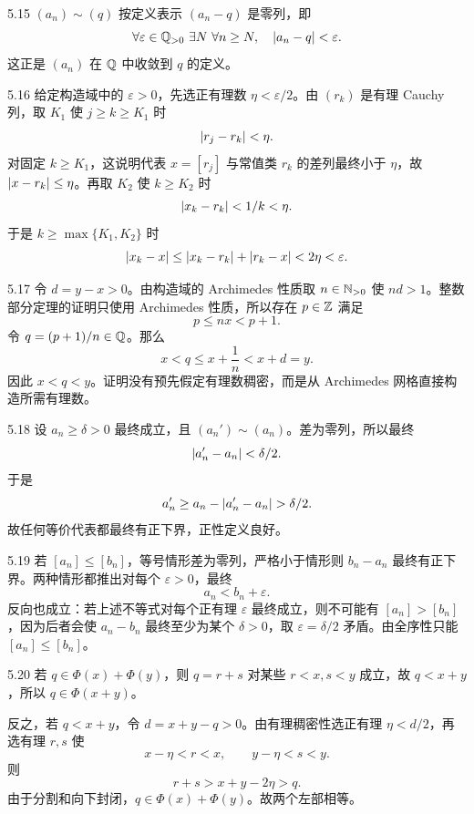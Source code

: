 \begin{solution}{5.15}
\((a_n)\sim(q)\) 按定义表示 \((a_n-q)\) 是零列，即
\[
 \forall\varepsilon\in\Q_{>0}\ \exists N\
 \forall n\ge N,\quad\abs{a_n-q}<\varepsilon.
\]
这正是 \((a_n)\) 在 \(\mathbb{Q}\) 中收敛到 \(q\) 的定义。
\end{solution}

\begin{solution}{5.16}
给定构造域中的 \(\varepsilon>0\)，先选正有理数 \(\eta<\varepsilon/2\)。由 \((r_k)\) 是有理 Cauchy 列，取 \(K_1\) 使 \(j\ge k\ge K_1\) 时
\[
 \left|r_j-r_k\right|<\eta.
\]
对固定 \(k\ge K_1\)，这说明代表 \(x=[r_j]\) 与常值类 \(r_k\) 的差列最终小于 \(\eta\)，故 \(\left|x-r_k\right|\le\eta\)。再取 \(K_2\) 使 \(k\ge K_2\) 时
\[
 \left|x_k-r_k\right|<1/k<\eta.
\]
于是 \(k\ge\max\{K_1,K_2\}\) 时
\[
 \left|x_k-x\right|\le\left|x_k-r_k\right|+\left|r_k-x\right|<2\eta<\varepsilon.
\]
\end{solution}

\begin{solution}{5.17}
令 \(d=y-x>0\)。由构造域的 Archimedes 性质取 \(n\in\mathbb{N}_{>0}\) 使 \(nd>1\)。整数部分定理的证明只使用 Archimedes 性质，所以存在 \(p\in\mathbb{Z}\) 满足
\[
 p\le nx<p+1.
\]
令 \(q=(p+1)/n\in\mathbb{Q}\)。那么
\[
 x<q\le x+\frac1n<x+d=y.
\]
因此 \(x<q<y\)。证明没有预先假定有理数稠密，而是从 Archimedes 网格直接构造所需有理数。
\end{solution}

\begin{solution}{5.18}
设 \(a_n\ge\delta>0\) 最终成立，且 \((a_n')\sim(a_n)\)。差为零列，所以最终
\[
 \left|a_n'-a_n\right|<\delta/2.
\]
于是
\[
 a_n'\ge a_n-\abs{a_n'-a_n}>\delta/2.
\]
故任何等价代表都最终有正下界，正性定义良好。
\end{solution}

\begin{solution}{5.19}
若 \([a_n]\le[b_n]\)，等号情形差为零列，严格小于情形则 \(b_n-a_n\) 最终有正下界。两种情形都推出对每个 \(\varepsilon>0\)，最终
\[
 a_n<b_n+\varepsilon.
\]
反向也成立：若上述不等式对每个正有理 \(\varepsilon\) 最终成立，则不可能有 \([a_n]>[b_n]\)，因为后者会使 \(a_n-b_n\) 最终至少为某个 \(\delta>0\)，取 \(\varepsilon=\delta/2\) 矛盾。由全序性只能 \([a_n]\le[b_n]\)。
\end{solution}

\begin{solution}{5.20}
若 \(q\in\Phi(x)+\Phi(y)\)，则 \(q=r+s\) 对某些 \(r<x,s<y\) 成立，故 \(q<x+y\)，所以 \(q\in\Phi(x+y)\)。

反之，若 \(q<x+y\)，令 \(d=x+y-q>0\)。由有理稠密性选正有理 \(\eta<d/2\)，再选有理 \(r,s\) 使
\[
 x-\eta<r<x,\qquad y-\eta<s<y.
\]
则
\[
 r+s>x+y-2\eta>q.
\]
由于分割和向下封闭，\(q\in\Phi(x)+\Phi(y)\)。故两个左部相等。
\end{solution}

